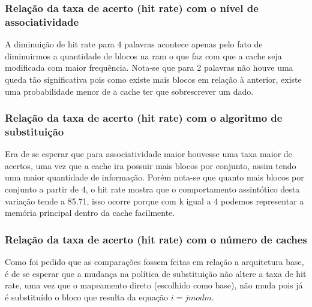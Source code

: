 \documentclass[10pt,a4paper]{article}
\begin{document}
\subsubsection{Relação da taxa de acerto (hit rate) com o nível de associatividade}
A diminuição de hit rate para 4 palavras acontece apenas pelo fato de diminuirmos a quantidade de blocos na ram o que faz com que a cache seja modificada com maior frequência. Nota-se que para 2 palavras não houve uma queda tão significativa pois como existe mais blocos em relação à anterior, existe uma probabilidade menor de a cache ter que sobrescrever um dado.
\subsubsection{Relação da taxa de acerto (hit rate) com o algoritmo de substituição}
Era de se esperar que para associatividade maior houvesse uma taxa maior de acertos, uma vez que a cache ira possuir mais blocos por conjunto, assim tendo uma maior quantidade de informação. Porém nota-se que quanto mais blocos por conjunto a partir de 4, o hit rate mostra que o comportamento assintótico desta variação tende a 85.71, isso ocorre porque com k igual a 4 podemos representar a memória principal dentro da cache facilmente.  
\subsubsection{Relação da taxa de acerto (hit rate) com o número de caches}
Como foi pedido que as comparações fossem feitas em relação a arquitetura base, é de se esperar que a mudança na política de substituição não altere a taxa de hit rate, uma vez que o mapeamento direto (escolhido como base), não muda pois já é substituído o bloco que resulta da equação $i = j mod m$.
\end{document}
